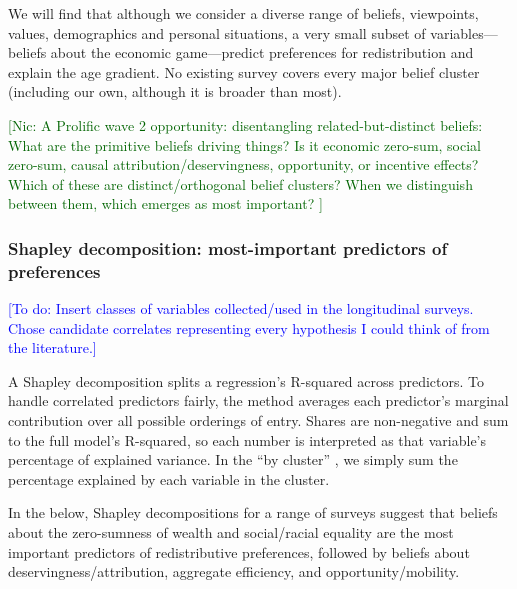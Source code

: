 \documentclass[11pt, headsepline]{article}
\newcommand{\nic}[1]{\noindent\textcolor{darkgreen}{[Nic: #1]}}
\newcommand{\todo}[1]{\noindent\textcolor{blue}{[To do: #1]}}
\begin{document}

We will find that although we consider a diverse range of beliefs, viewpoints, values, demographics and personal situations, a very small subset of variables---beliefs about the economic game---predict preferences for redistribution and explain the age gradient. No existing survey covers every major belief cluster (including our own, although it is broader than most).

\nic{A Prolific wave 2 opportunity: disentangling related-but-distinct beliefs: What are the primitive beliefs driving things? Is it economic zero-sum, social zero-sum, causal attribution/deservingness, opportunity, or incentive effects? Which of these are distinct/orthogonal belief clusters? When we distinguish between them, which emerges as most important? }


\subsubsection{Shapley decomposition: most-important predictors of preferences}


\todo{Insert classes of variables collected/used in the longitudinal surveys. Chose candidate correlates representing every hypothesis I could think of from the literature.}

A Shapley decomposition splits a regression's R-squared across predictors. To handle correlated predictors fairly, the method averages each predictor's marginal contribution over all possible orderings of entry. Shares are non-negative and sum to the full model's R-squared, so each number is interpreted as that variable's percentage of explained variance. In the ``by cluster'' , we simply sum the percentage explained by each variable in the cluster.

In the  below, Shapley decompositions for a range of surveys suggest that beliefs about the zero-sumness of wealth and social/racial equality are the most important predictors of redistributive preferences, followed by beliefs about deservingness/attribution, aggregate efficiency, and opportunity/mobility. 
\end{document}
